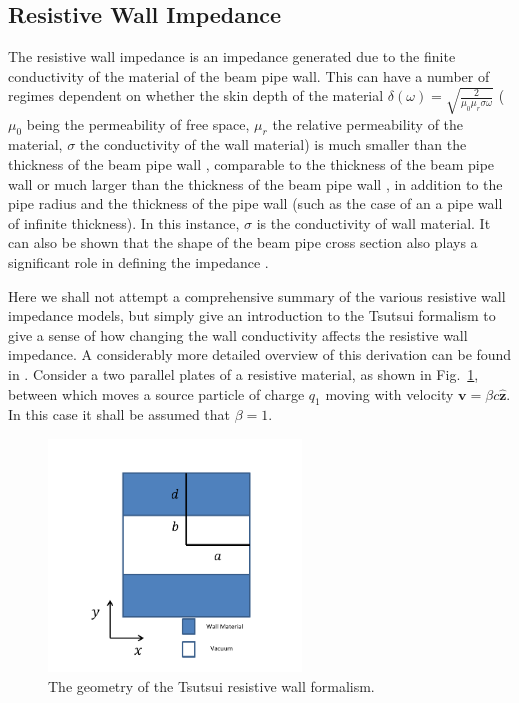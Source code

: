 \subsection{Resistive Wall Impedance}
\label{sec:res_wall_imp}

The resistive wall impedance is an impedance generated due to the finite conductivity of the material of the beam pipe wall. This can have a number of regimes dependent on whether the skin depth of the material $\delta \left( \omega \right) = \sqrt{\frac{2}{\mu_{0} \mu_{r} \sigma \omega}}$ ($\mu_{0}$ being the permeability of free space, $\mu_{r}$ the relative permeability of the material, $\sigma$ the conductivity of the wall material) is much smaller than the thickness of the beam pipe wall \cite{Chao:PhysColEff}, comparable to the thickness of the beam pipe wall \cite{Roncarolo:ColImpMeas, Metral:ResWallWideFreq} or much larger than the thickness of the beam pipe wall \cite{Tsutsui:ferrKickLong, Biancacci:MMFiniteInsert}, in addition to the pipe radius and the thickness of the pipe wall (such as the case of an a pipe wall of infinite thickness). In this instance, $\sigma$ is the conductivity of wall material. It can also be shown that the shape of the beam pipe cross section also plays a significant role in defining the impedance \cite{Mounet:Axisymmetric, Mounet:Flat}.

Here we shall not attempt a comprehensive summary of the various resistive wall impedance models, but simply give an introduction to the Tsutsui formalism to give a sense of how changing the wall conductivity affects the resistive wall impedance. A considerably more detailed overview of this derivation can be found in \cite{Tsutsui:ferrKickLong, Tsutsui:DipoleKicker}. Consider a two parallel plates of a resistive material, as shown in Fig.~\ref{fig:res_wall_diagram}, between which moves a source particle of charge $q_{1}$ moving with velocity $\mathbf{v} = \beta c \mathbf{\hat{z}}$. In this case it shall be assumed that $\beta = 1$.

\begin{figure}
\begin{center}
\includegraphics[width=0.6\textwidth]{Wakefields_and_Impedances/figures/reWallGeo.pdf}
\end{center}
\caption{The geometry of the Tsutsui resistive wall formalism.}
\label{fig:res_wall_diagram}
\end{figure}

